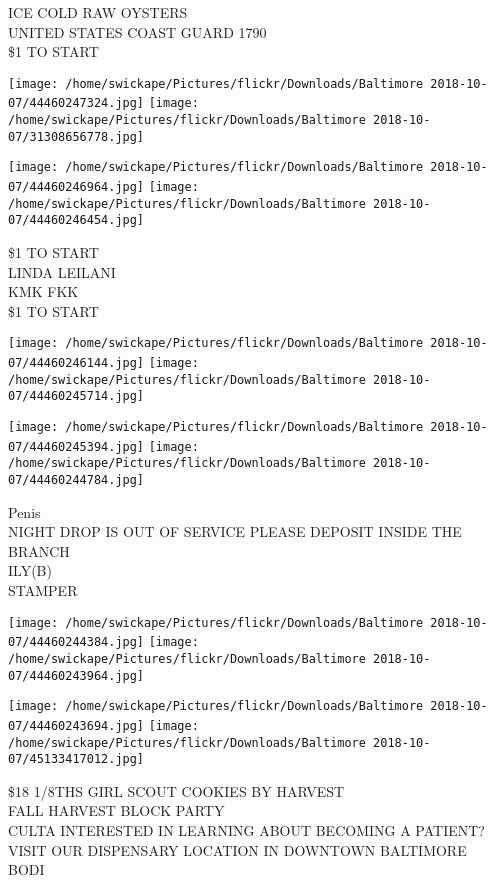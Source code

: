 \documentclass[10pt,letterpaper]{article}
\begin{document}
ICE COLD RAW OYSTERS\\
UNITED STATES COAST GUARD 1790\\
\$1 TO START\\
\pagebreak

\texttt{[image: /home/swickape/Pictures/flickr/Downloads/Baltimore 2018-10-07/44460247324.jpg]}
\texttt{[image: /home/swickape/Pictures/flickr/Downloads/Baltimore 2018-10-07/31308656778.jpg]}

\texttt{[image: /home/swickape/Pictures/flickr/Downloads/Baltimore 2018-10-07/44460246964.jpg]}
\texttt{[image: /home/swickape/Pictures/flickr/Downloads/Baltimore 2018-10-07/44460246454.jpg]}

\$1 TO START\\
LINDA LEILANI\\
KMK FKK\\
\$1 TO START\\
\pagebreak

\texttt{[image: /home/swickape/Pictures/flickr/Downloads/Baltimore 2018-10-07/44460246144.jpg]}
\texttt{[image: /home/swickape/Pictures/flickr/Downloads/Baltimore 2018-10-07/44460245714.jpg]}

\texttt{[image: /home/swickape/Pictures/flickr/Downloads/Baltimore 2018-10-07/44460245394.jpg]}
\texttt{[image: /home/swickape/Pictures/flickr/Downloads/Baltimore 2018-10-07/44460244784.jpg]}

Penis\\
NIGHT DROP IS OUT OF SERVICE PLEASE DEPOSIT INSIDE THE BRANCH\\
ILY(B)\\
STAMPER\\
\pagebreak

\texttt{[image: /home/swickape/Pictures/flickr/Downloads/Baltimore 2018-10-07/44460244384.jpg]}
\texttt{[image: /home/swickape/Pictures/flickr/Downloads/Baltimore 2018-10-07/44460243964.jpg]}

\texttt{[image: /home/swickape/Pictures/flickr/Downloads/Baltimore 2018-10-07/44460243694.jpg]}
\texttt{[image: /home/swickape/Pictures/flickr/Downloads/Baltimore 2018-10-07/45133417012.jpg]}

\$18 1/8THS GIRL SCOUT COOKIES BY HARVEST\\
FALL HARVEST BLOCK PARTY\\
CULTA INTERESTED IN LEARNING ABOUT BECOMING A PATIENT?  VISIT OUR DISPENSARY LOCATION IN DOWNTOWN BALTIMORE\\
BODI\\
\pagebreak
\end{document}
